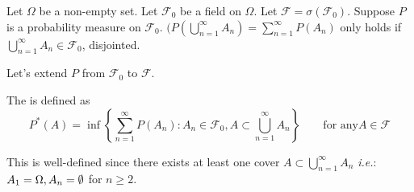 \documentclass[class=article,crop=false]{standalone}
\begin{document}
Let $\Omega$ be a non-empty set. Let $\mathcal{F}_0$ be a field on $\Omega$. Let $\mathcal{F} = \sigma(\mathcal{F}_0)$. Suppose $P$ is a probability measure on  $\mathcal{F}_0$. $(P(\bigcup_{n= 1}^{\infty} A_n) = \sum_{ n=1}^{\infty} P(A_n)$ only holds if $\bigcup_{n= 1}^{\infty} A_n \in \mathcal{F}_0$, disjointed.

Let's extend $P$ from  $\mathcal{F}_0$ to $\mathcal{F}$.

\begin{defn}
	The  is defined as 
	\[
		P^* (A) = \inf\left\{\sum_{ n=1}^{\infty} P(A_n): A_n \in \mathcal{F}_0, A \subset \bigcup_{n= 1}^{\infty} A_n\right\} \qquad \text{for any} A \in \mathcal{F} 
	\]
\end{defn}
\begin{note}[]
This is well-defined since there exists at least one cover $A \subset  \bigcup_{n= 1}^{\infty} A_n$ \emph{i.e.}:  $A_1 = \Omega, A_n=\emptyset$ for $n \geq 2$.
\end{note}
\end{document}
